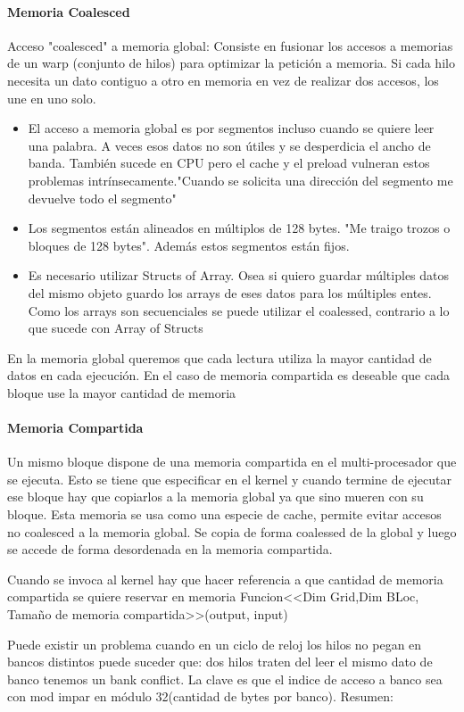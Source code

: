 \documentclass[]{scrartcl}
\begin{document}
\paragraph{Memoria Coalesced}
Acceso "coalesced" a memoria global: Consiste en fusionar los accesos a memorias de un warp (conjunto de hilos) para optimizar la petición a memoria. Si cada hilo necesita un dato contiguo a otro en memoria en vez de realizar dos accesos, los une en uno solo. 
\begin{itemize}
	\item El acceso a memoria global es por segmentos incluso cuando se quiere leer una palabra. A veces esos datos no son útiles y se desperdicia el ancho de banda. También sucede en CPU pero el cache y el preload vulneran estos problemas intrínsecamente."Cuando se solicita una dirección del segmento me devuelve todo el segmento" 
	\item Los segmentos están alineados en múltiplos de 128 bytes. "Me traigo trozos o bloques de 128 bytes". Además estos segmentos están fijos.
	\item Es necesario utilizar Structs of Array. Osea si quiero guardar múltiples datos del mismo objeto guardo los arrays de eses datos para los múltiples entes. Como los arrays son secuenciales se puede utilizar el coalessed, contrario a lo que sucede con Array of Structs
\end{itemize}

En la memoria global queremos que cada lectura utiliza la mayor cantidad de datos en cada ejecución. En el caso de memoria compartida es deseable que cada bloque use la mayor cantidad de memoria
\paragraph{Memoria Compartida}
Un mismo bloque dispone de una memoria compartida en el multi-procesador que se ejecuta. Esto se tiene que especificar en el kernel y cuando termine de ejecutar ese bloque hay que copiarlos a la memoria global ya que sino mueren con su bloque. Esta memoria se usa como una especie de cache, permite evitar accesos no coalesced a la memoria global. Se copia de forma coalessed de la global y luego se accede de forma desordenada en la memoria compartida.  

Cuando se invoca al kernel hay que hacer referencia a que cantidad de memoria compartida se quiere reservar en memoria Funcion<<Dim Grid,Dim BLoc, Tamaño de memoria compartida>>(output, input)

Puede existir un problema cuando en un ciclo de reloj los hilos no pegan en bancos distintos puede suceder que: dos hilos traten del leer el mismo dato de banco tenemos un bank conflict. La clave es que el indice de acceso a banco sea con mod impar en módulo 32(cantidad de bytes por banco). Resumen:
\end{document}
